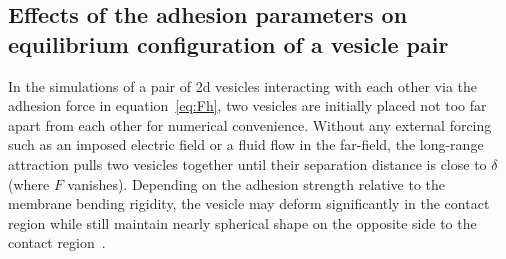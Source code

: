 \documentclass[prf,superscriptaddress,showpacs]{revtex4-1}
\begin{document}
\subsection{Effects of the adhesion parameters on equilibrium configuration of a vesicle pair}
\label{subsec:qflow_adhesion_parameters} 
In the simulations of a pair of 2d vesicles interacting with each other
via the adhesion force in equation~\eqref{eq:Fh}, two vesicles are
initially placed not too far apart  from each other for numerical
convenience.  Without any external forcing such as an imposed electric
field or a fluid flow in the far-field, the long-range attraction pulls
two vesicles together until their separation distance is close to
$\delta$ (where $F$ vanishes).  Depending on the adhesion strength
relative to the membrane bending rigidity, the vesicle may deform
significantly in the contact region while still maintain nearly
spherical shape on the opposite side to the contact
region~\cite{EvansMetcalfe1984_BJ, Book_PhysicalBasisCellAdhesion,
Book_IntermolecularSurfaceForces,
RamachandranAndersonLealIsraelachvili2010_Langmuir}.
\end{document}
